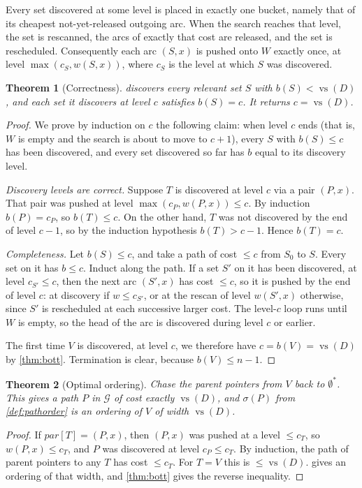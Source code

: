 \documentclass[11pt]{article}
\newtheorem{theorem}{Theorem}
\theoremstyle{definition}
\newcommand{\vs}{\operatorname{vs}}
\newcommand{\Gr}{\mathcal{G}}
\newcommand{\cost}{w}
\newcommand{\bott}{b}
\begin{document}
Every set discovered at some level is placed in exactly one bucket, namely
that of its cheapest not-yet-released outgoing arc. When the search reaches
that level, the set is rescanned, the arcs of exactly that cost are released,
and the set is rescheduled. Consequently each arc $(S,x)$ is pushed onto
$W$ exactly once, at level $\max(c_S,\cost(S,x))$, where $c_S$ is the level
at which $S$ was discovered.

\begin{theorem}[Correctness]\label{thm:correct}
 discovers every relevant set $S$ with $\bott(S)<\vs(D)$,
and each set it discovers at level $c$ satisfies $\bott(S)=c$. It returns
$c=\vs(D)$.
\end{theorem}
\begin{proof}
We prove by induction on $c$ the following claim: when level $c$ ends (that
is, $W$ is empty and the search is about to move to $c+1$), every $S$ with
$\bott(S)\le c$ has been discovered, and every set discovered so far has
$\bott$ equal to its discovery level.

\emph{Discovery levels are correct.} Suppose $T$ is discovered at level $c$
via a pair $(P,x)$. That pair was pushed at level
$\max(c_P,\cost(P,x))\le c$. By induction $\bott(P)=c_P$, so
$\bott(T)\le c$. On the other hand, $T$ was not discovered by the end of
level $c-1$, so by the induction hypothesis $\bott(T)>c-1$. Hence
$\bott(T)=c$.

\emph{Completeness.} Let $\bott(S)\le c$, and take a path of cost $\le c$
from $S_0$ to $S$. Every set on it has $\bott\le c$. Induct along the
path. If a set $S'$ on it has been discovered, at level $c_{S'}\le c$, then
the next arc $(S',x)$ has cost $\le c$, so it is pushed by the end of
level $c$: at discovery if $\cost\le c_{S'}$, or at the rescan of level
$\cost(S',x)$ otherwise, since $S'$ is rescheduled at each successive
larger cost. The level-$c$ loop runs until $W$ is empty, so the head of the
arc is discovered during level $c$ or earlier.

The first time $V$ is discovered, at level $c$, we therefore have
$c=\bott(V)=\vs(D)$ by \cref{thm:bott}. Termination is clear, because
$\bott(V)\le n-1$.
\end{proof}

\begin{theorem}[Optimal ordering]\label{thm:order}
Chase the parent pointers from $V$ back to $\emptyset^*$. This gives a path
$P$ in $\Gr$ of cost exactly $\vs(D)$, and $\sigma(P)$ from
\cref{def:pathorder} is an ordering of $V$ of width $\vs(D)$.
\end{theorem}
\begin{proof}
If $\mathit{par}[T]=(P,x)$, then $(P,x)$ was pushed at a level $\le c_T$,
so $\cost(P,x)\le c_T$, and $P$ was discovered at level $c_P\le c_T$. By
induction, the path of parent pointers to any $T$ has cost $\le c_T$. For
$T=V$ this is $\le\vs(D)$.  gives an ordering of that
width, and \cref{thm:bott} gives the reverse inequality.
\end{proof}
\end{document}
